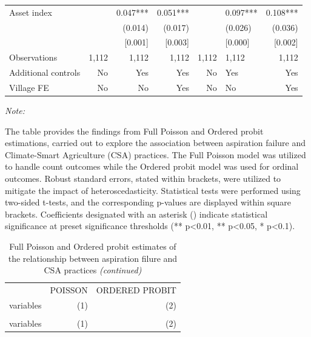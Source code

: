 \documentclass[
]{article}
\begin{document}
\begin{landscape}
\begin{ThreePartTable}
\begin{longtable}[t]{lrrrrlr}
Asset index &  & 0.047*** & 0.051*** &  & 0.097*** & 0.108***\\
 &  & (0.014) & (0.017) &  & (0.026) & (0.036)\\
 &  & {}[0.001] & {}[0.003] &  & {}[0.000] & {}[0.002]\\
Observations & 1,112 & 1,112 & 1,112 & 1,112 & 1,112 & 1,112\\
Additional controls & No & Yes & Yes & No & Yes & Yes\\
Village FE & No & No & Yes & No & No & Yes\\*
\end{longtable}
\end{ThreePartTable}
\endgroup{}
\end{landscape}
\newpage

\begin{landscape}\begingroup\fontsize{7}{9}\selectfont

\begin{ThreePartTable}
\begin{TableNotes}[para]
\item \textit{Note: } 
\item The table provides the findings from Full Poisson and Ordered probit estimations, carried out to explore the association between aspiration failure and Climate-Smart Agriculture (CSA) practices. The Full Poisson model was utilized to handle count outcomes while the Ordered probit model was used for ordinal outcomes. Robust standard errors, stated within brackets, were utilized to mitigate the impact of heteroscedasticity. Statistical tests were performed using two-sided t-tests, and the corresponding p-values are displayed within square brackets. Coefficients designated with an asterisk () indicate statistical significance at preset significance thresholds (** p<0.01, ** p<0.05, * p<0.1).
\end{TableNotes}
\begin{longtable}[t]{lrr}
\caption{\label{tab:unnamed-chunk-16}Full Poisson and Ordered probit estimates of the relationship between aspiration filure and CSA practices}\\
\toprule
\multicolumn{1}{c}{ } & \multicolumn{1}{c}{POISSON} & \multicolumn{1}{c}{ORDERED PROBIT} \\
\cmidrule(l{3pt}r{3pt}){2-2} \cmidrule(l{3pt}r{3pt}){3-3}
variables & (1) & (2)\\
\midrule
\endfirsthead
\caption[]{\label{tab:unnamed-chunk-16}Full Poisson and Ordered probit estimates of the relationship between aspiration filure and CSA practices \textit{(continued)}}\\
\toprule
variables & (1) & (2)\\
\midrule
\endhead


\end{longtable}
\end{ThreePartTable}
\end{landscape}
\end{document}

